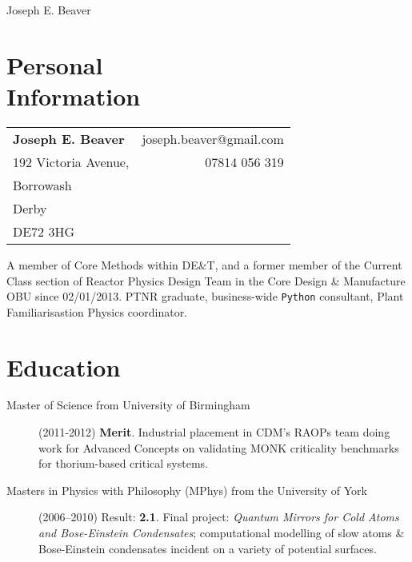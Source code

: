 \documentclass[margin,line]{resume}
\begin{document}
{\sc \Large Joseph E. Beaver}

\begin{resume}

	\section{\mysidestyle Personal\\ Information}\vspace{1em}
	\hspace{-0.5em}\begin{tabular}[t]{p{} r}
		\textbf{Joseph E. Beaver} & joseph.beaver@gmail.com \\
		192 Victoria Avenue,      & 07814 056 319           \\
		Borrowash                 &                         \\
		Derby                     &                         \\
		DE72 3HG                  &
	\end{tabular}

	A member of Core Methods within DE\&T, and a former member of the Current
	Class section of Reactor Physics Design Team in the Core Design \&
	Manufacture OBU since 02/01/2013. \textsc{PTNR} graduate, business-wide
	\texttt{Python} consultant, Plant Familiarisastion Physics coordinator.

	\section{\mysidestyle Education}\vspace{1mm}

	\begin{description}

		\item[Master of Science from University of Birmingham] (2011-2012)
		      \textbf{Merit}. Industrial placement in \textsc{CDM}'s \textsc{RAOP}s
		      team doing work for Advanced Concepts on validating MONK criticality
		      benchmarks for thorium-based critical systems.

		\item[Masters in Physics with Philosophy (MPhys) from the University of York]
		      (2006--2010) \linebreak Result: \textbf{2.1}. Final project:
		      \textit{Quantum Mirrors for Cold Atoms and Bose-Einstein
			      Condensates}; computational modelling of slow atoms \& Bose-Einstein
		      condensates incident on a variety of potential surfaces.


\end{description}
\end{resume}
\end{document}
